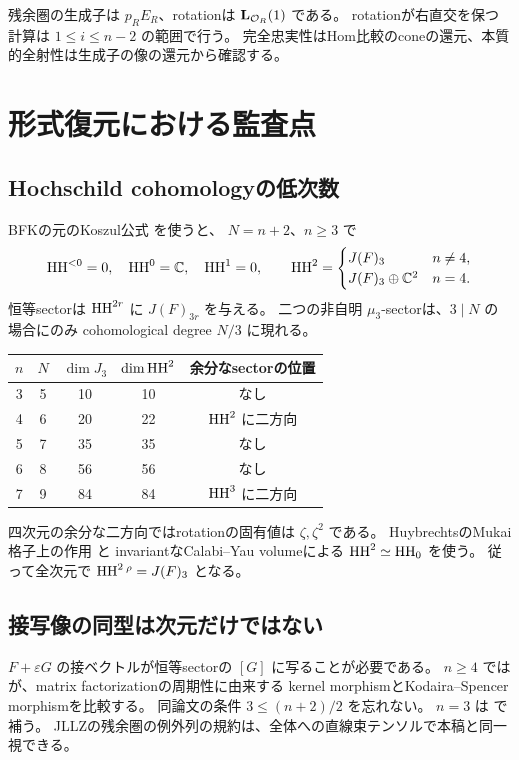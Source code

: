 残余圏の生成子は \(p_RE_R\)、rotationは \(\mathbf L_{\mathcal O_R}(1)\) である。
rotationが右直交を保つ計算は \(1\le i\le n-2\) の範囲で行う。
完全忠実性はHom比較のconeの還元、本質的全射性は生成子の像の還元から確認する。

\section{形式復元における監査点}

\subsection{Hochschild cohomologyの低次数}

BFKの元のKoszul公式 \cite[Theorem 5.39]{BFK} を使うと、
\(N=n+2\)、\(n\ge3\) で
\[
 \operatorname{HH}^{<0}=0,\quad \operatorname{HH}^0=\mathbb C,\quad \operatorname{HH}^1=0,
 \qquad
 \operatorname{HH}^2=
 \begin{cases}J(F)_3&n\ne4,\\J(F)_3\oplus\mathbb C^2&n=4.\end{cases}
\]
恒等sectorは \(\operatorname{HH}^{2r}\) に \(J(F)_{3r}\) を与える。
二つの非自明 \(\mu_3\)-sectorは、\(3\mid N\) の場合にのみ
cohomological degree \(N/3\) に現れる。

\begin{center}
\begin{tabular}{ccccc}
\toprule
\(n\)&\(N\)&\(\dim J_3\)&\(\dim\operatorname{HH}^2\)&余分なsectorの位置\\
\midrule
3&5&10&10&なし\\
4&6&20&22&\(\operatorname{HH}^2\) に二方向\\
5&7&35&35&なし\\
6&8&56&56&なし\\
7&9&84&84&\(\operatorname{HH}^3\) に二方向\\
\bottomrule
\end{tabular}
\end{center}

四次元の余分な二方向ではrotationの固有値は \(\zeta,\zeta^2\) である。
HuybrechtsのMukai格子上の作用 \cite[Proposition 3.12]{Huy} と
invariantなCalabi--Yau volumeによる \(\operatorname{HH}^2\simeq\operatorname{HH}_0\) を使う。
従って全次元で \(\operatorname{HH}^2{}^\rho=J(F)_3\) となる。

\subsection{接写像の同型は次元だけではない}

\(F+\varepsilon G\) の接ベクトルが恒等sectorの \([G]\) に写ることが必要である。
\(n\ge4\) では \cite[Lemma 2.19]{HR} が、matrix factorizationの周期性に由来する
kernel morphismとKodaira--Spencer morphismを比較する。
同論文の条件 \(3\le(n+2)/2\) を忘れない。
\(n=3\) は \cite[Theorem 4.4(2)]{JLLZ} で補う。
JLLZの残余圏の例外列の規約は、全体への直線束テンソルで本稿と同一視できる。

